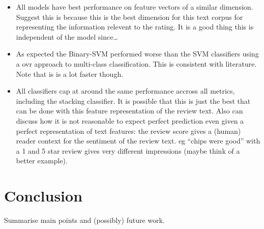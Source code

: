 \documentclass[11pt]{article}
\newcommand{\drafting}[1]{\textcolor{OliveGreen}{#1}}
\begin{document}
\drafting{
    \begin{itemize}
        \item All models have best performance on feature vectors of a similar dimension. Suggest this is because this is the best dimension for this text corpus for representing the information relevent to the rating. It is a good thing this is independent of the model since\dots
        \item As expected the Binary-SVM performed worse than the SVM classifiers using a ovr approach to multi-class classification. This is consistent with literature. Note that is is a lot faster though.
        \item All classifiers cap at around the same performance accross all metrics, including the stacking classifier. It is possible that this is just the best that can be done with this feature representation of the review text. Also can discuss how it is not reasonable to expect perfect prediction even given a perfect representation of text features: the review score gives a (human) reader context for the sentiment of the review text. eg ``chips were good'' with a 1 and 5 star review gives very different impressions (maybe think of a better example).
    \end{itemize}
}

\section{Conclusion}
\drafting{Summarise main points and (possibly) future work.}


\nocite{mukherjee_what_2013}
\nocite{rayana_collective_2015}

\nocite{sklearn_pedregosa_scikit-learn_2011}
\nocite{gensim_rehurek_software_2010}


\end{document}
